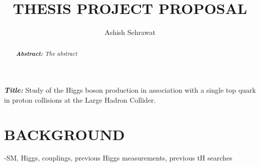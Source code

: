 \documentclass[final,3p]{CSP}
\begin{document}
\begin{frontmatter}

\title{THESIS PROJECT PROPOSAL}

\author[]{Ashish Sehrawat}


\address[mymainaddress]{Universidad de Sonora}



\begin{keyword}\rm
\begin{adjustwidth}{2cm}{2cm}{\itshape\textbf{Title:}}  
Study of the Higgs boson production in association with a single top quark in proton collisions at the Large Hadron Collider.
\end{adjustwidth}
\end{keyword}

\begin{abstract}\rm
\itshape\textbf{Abstract:}
The abstract
\end{abstract}


\end{frontmatter}

\section{BACKGROUND}
\cite{Dirac1953888}

-SM, Higgs, couplings, previous Higgs measurements, previous tH searches
\end{document}
